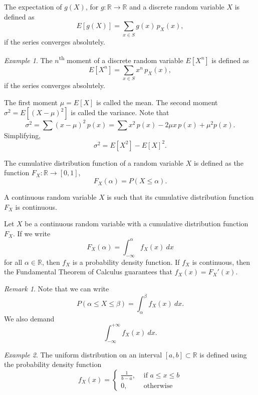 \documentclass[11pt]{article}
\def\R{\mathbb{R}}
\newcommand\E[1]{E\left[#1\right]}
\theoremstyle{definition}
\theoremstyle{remark}
\newtheorem*{remark}{Remark}
\newtheorem*{example}{Example}
\numberwithin{equation}{module}
\begin{document}
    \begin{definition}[Expectation]
        The expectation of $g(X)$, for $g\colon \R \to \R$ and a discrete random
        variable $X$ is defined as \[
            \E{g(X)} = \sum_{x \in S} g(x)\,p_X(x),
        \] if the series converges absolutely.
    \end{definition}
    \begin{example}
        The $n$\textsuperscript{th} moment of a discrete random variable $\E{X^n}$
        is defined as \[
            \E{X^n} = \sum_{x \in S} x^n\,p_X(x),
        \] if the series converges absolutely.

        The first moment $\mu = \E{X}$ is called the mean.
        The second moment $\sigma^2 = \E{(X - \mu)^2}$ is called the variance.
        Note that \[
            \sigma^2 = \sum (x - \mu)^2\, p(x) = \sum x^2\,p(x) - 2\mu x\,p(x) +
            \mu^2 p(x).
        \] Simplifying, \[
            \sigma^2 = \E{X^2} - \E{X}^2.
        \] 
    \end{example}

    \begin{definition}
        The cumulative distribution function of a random variable $X$ is
        defined as the function $F_X\colon \R \to [0, 1]$, \[
            F_X(\alpha) = P(X \leq \alpha).
        \] 
    \end{definition}

    \begin{definition}
        A continuous random variable $X$ is such that its cumulative distribution
        function $F_X$ is continuous.
    \end{definition}

    \begin{definition}
        Let $X$ be a continuous random variable with a cumulative distribution
        function $F_X$. If we write \[
            F_X(\alpha) = \int_{-\infty}^\alpha f_X(x)\:dx
        \] for all $\alpha \in \R$, then $f_X$ is a probability density function.
        If $f_X$ is continuous, then the Fundamental Theorem of Calculus guarantees
        that $f_X(x) = F_X'(x)$.
        \begin{remark}
            Note that we can write \[
                P(\alpha \leq X \leq \beta) = \int_\alpha^\beta f_X(x)\:dx.
            \] We also demand \[
                \int_{-\infty}^{+\infty} f_X(x) \:dx.
            \] 
        \end{remark}
    \end{definition}
    \begin{example}
        The uniform distribution on an interval $[a, b] \subset \R$ is defined using
        the probability density function \[
            f_X(x) = \begin{cases}
                \frac{1}{b - a}, &\text{ if }a \leq x \leq b \\
                0, &\text{ otherwise }
            \end{cases}
        \]
    \end{example}
\end{document}
